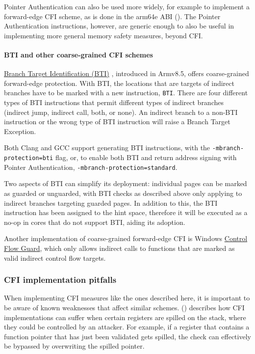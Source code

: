 \documentclass[
  a4paper,
]{report}
\begin{document}
Pointer Authentication can also be used more widely, for example to
implement a forward-edge CFI scheme, as is done in the arm64e ABI
(). The Pointer
Authentication instructions, however, are generic enough to also be
useful in implementing more general memory safety measures, beyond CFI.

\paragraph{BTI and other coarse-grained CFI schemes}\label{sec:bti}

\href{https://developer.arm.com/documentation/102433/0100/Jump-oriented-programming?lang=en}{Branch
Target Identification (BTI)} , introduced in Armv8.5, offers
coarse-grained forward-edge protection. With BTI, the locations that are
targets of indirect branches have to be marked with a new instruction,
\texttt{BTI}. There are four different types of BTI instructions that
permit different types of indirect branches (indirect jump, indirect
call, both, or none). An indirect branch to a non-BTI instruction or the
wrong type of BTI instruction will raise a Branch Target Exception.

Both Clang and GCC support generating BTI instructions, with the
\texttt{-mbranch-protection=bti} flag, or, to enable both BTI and return
address signing with Pointer Authentication,
\texttt{-mbranch-protection=standard}.

Two aspects of BTI can simplify its deployment: individual pages can be
marked as guarded or unguarded, with BTI checks as described above only
applying to indirect branches targeting guarded pages. In addition to
this, the BTI instruction has been assigned to the hint space, therefore
it will be executed as a no-op in cores that do not support BTI, aiding
its adoption.

Another implementation of coarse-grained forward-edge CFI is Windows
\href{https://docs.microsoft.com/en-us/windows/win32/secbp/control-flow-guard}{Control
Flow Guard}, which only allows indirect calls to functions that are
marked as valid indirect control flow targets.

\subsubsection{CFI implementation
pitfalls}\label{cfi-implementation-pitfalls}

When implementing CFI measures like the ones described here, it is
important to be aware of known weaknesses that affect similar schemes.
() describes how CFI
implementations can suffer when certain registers are spilled on the
stack, where they could be controlled by an attacker. For example, if a
register that contains a function pointer that has just been validated
gets spilled, the check can effectively be bypassed by overwriting the
spilled pointer.
\end{document}
